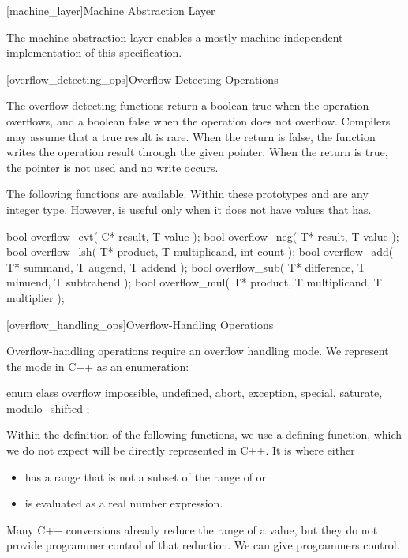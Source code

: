 \begin{addedblock}
[machine_layer]{Machine Abstraction Layer}

The machine abstraction layer enables a mostly machine-independent implementation of this specification.

[overflow_detecting_ops]{Overflow-Detecting Operations}

The overflow-detecting functions return a boolean true when the operation overflows, and a boolean false when the operation does not overflow. Compilers may assume that a true result is rare. When the return is false, the function writes the operation result through the given pointer. When the return is true, the pointer is not used and no write occurs.

The following functions are available. Within these prototypes  and  are any integer type. However,  is useful only when it does not have values that  has.

\begin{codeblock}
bool overflow_cvt( C* result, T value );
bool overflow_neg( T* result, T value );
bool overflow_lsh( T* product, T multiplicand, int count );
bool overflow_add( T* summand, T augend, T addend );
bool overflow_sub( T* difference, T minuend, T subtrahend );
bool overflow_mul( T* product, T multiplicand, T multiplier );
\end{codeblock}

[overflow_handling_ops]{Overflow-Handling Operations}

Overflow-handling operations require an overflow handling mode. We represent the mode in C++ as an enumeration:

\begin{codeblock}
enum class overflow {
	impossible, undefined, abort, exception,
	special,
	saturate, modulo_shifted
};
\end{codeblock}

Within the definition of the following functions, we use a defining function, which we do not expect will be directly represented in C++. It is  where  either
\begin{itemize}
\item has a range that is not a subset of the range of  or
\item is evaluated as a real number expression.
\end{itemize}

Many C++ conversions already reduce the range of a value, but they do not provide programmer control of that reduction. We can give programmers control.


\end{addedblock}
